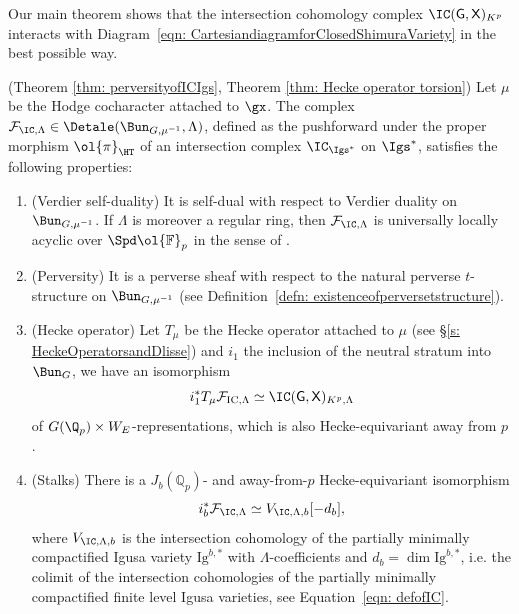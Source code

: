\documentclass[letterpaper,11pt]{amsart}
\begin{document}
Our main theorem shows that the intersection cohomology complex $\IC(\mathsf{G}, \mathsf{X})_{K^p}$ interacts with Diagram~\eqref{eqn: CartesiandiagramforClosedShimuraVariety} in the best possible way. 

\begin{theorem}{\label{thm: main}}{(Theorem \ref{thm: perversityofICIgs}, Theorem \ref{thm: Hecke operator torsion})}
Let $\mu$ be the Hodge cocharacter attached to $\gx$. The complex $\mathcal{F}_{\IC,\Lambda}\in \Detale(\Bun_{G,\mu^{-1}}, \Lambda)$, defined as the pushforward under the proper morphism $\ol{\pi}_{\HT}$ of an intersection complex $\IC_{\Igs^*}$ on $\Igs^*$, satisfies the following properties: 
\begin{enumerate}
    \item (Verdier self-duality) It is self-dual with respect to Verdier duality on $\Bun_{G,\mu^{-1}}$. If $\Lambda$ is moreover a regular ring, then $\mathcal{F}_{\IC,\Lambda}$ is universally locally acyclic over $\Spd \ol{\mathbb{F}}_{p}$ in the sense of \cite[Section IV.2]{FSGeomLLC}. 

\medskip 
    
    \item (Perversity) It is a perverse sheaf with respect to the natural perverse $t$-structure on $\Bun_{G,\mu^{-1}}$ (see Definition~\ref{defn: existenceofperversetstructure}).

\medskip 

    \item (Hecke operator) Let $T_{\mu}$ be the Hecke operator attached to $\mu$ (see \S \ref{s: HeckeOperatorsandDlisse}) and $i_1$ the inclusion of the neutral stratum into $\Bun_G$, we have an isomorphism
\begin{equation}\label{eq:geom Hecke operator formula}
i_{1}^{*}T_{\mu}\mathcal{F}_{\mathrm{IC},\Lambda} \simeq 
\IC(\mathsf{G},\mathsf{X})_{K^p,\Lambda}    
\end{equation}
of $G(\Q_p) \times W_{E}$-representations, which is also Hecke-equivariant away from $p$. 

\medskip 

\item (Stalks) There is a $J_b(\mathbb{Q}_p)$- and away-from-$p$ Hecke-equivariant isomorphism 
    \[
    i_b^*\mathcal{F}_{\IC,\Lambda} \simeq V_{\IC,\Lambda,b}[-d_b], 
    \]
    where $V_{\IC,\Lambda,b}$ is the intersection cohomology of the partially minimally compactified Igusa variety $\mathrm{Ig}^{b,*}$ with $\Lambda$-coefficients and $d_b = \dim\mathrm{Ig}^{b,*}$, i.e. the colimit of the intersection cohomologies of the partially minimally compactified finite level Igusa varieties, see Equation~\eqref{eqn: defofIC}.
\end{enumerate}
\end{theorem}
\end{document}
